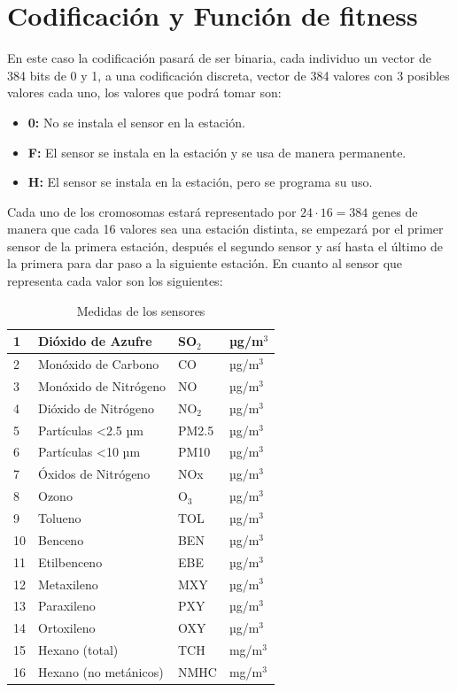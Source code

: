 \documentclass[12pt, spanish, pdftex]{UC3M_document}
\begin{document}
\section{Codificación y Función de fitness}
En este caso la codificación pasará de ser binaria, cada individuo un vector de 384 bits de 0 y 1, a una codificación discreta, vector de 384 valores con 3 posibles valores cada uno, los valores que podrá tomar son:
\begin{itemize}
	\item \textbf{0:} No se instala el sensor en la estación.
	\item \textbf{F:} El sensor se instala en la estación y se usa de manera permanente.
	\item \textbf{H:} El sensor se instala en la estación, pero se programa su uso.
\end{itemize}
Cada uno de los cromosomas estará representado por $24 \cdot 16=384$ genes de manera que cada 16 valores sea una estación distinta, se empezará por el primer sensor de la primera estación, después el segundo sensor y así hasta el último de la primera para dar paso a la siguiente estación. En cuanto al sensor que representa cada valor son los siguientes:
\begin{table}[H]
	\centering
	\caption{Medidas de los sensores}
	\begin{tabular}{|l|l|l|l|}
		\hline
		1  & Dióxido de Azufre           & SO$_2$ & µg/m$^3$ \\ \hline
		2  & Monóxido de Carbono         & CO     & µg/m$^3$ \\ \hline
		3  & Monóxido de Nitrógeno       & NO     & µg/m$^3$ \\ \hline
		4  & Dióxido de Nitrógeno        & NO$_2$ & µg/m$^3$ \\ \hline
		5  & Partículas \textless 2.5 µm & PM2.5  & µg/m$^3$ \\ \hline
		6  & Partículas \textless 10 µm  & PM10   & µg/m$^3$ \\ \hline
		7  & Óxidos de Nitrógeno         & NOx    & µg/m$^3$ \\ \hline
		8  & Ozono                       & O$_3$  & µg/m$^3$ \\ \hline
		9  & Tolueno                     & TOL    & µg/m$^3$ \\ \hline
		10 & Benceno                     & BEN    & µg/m$^3$ \\ \hline
		11 & Etilbenceno                 & EBE    & µg/m$^3$ \\ \hline
		12 & Metaxileno                  & MXY    & µg/m$^3$ \\ \hline
		13 & Paraxileno                  & PXY    & µg/m$^3$ \\ \hline
		14 & Ortoxileno                  & OXY    & µg/m$^3$ \\ \hline
		15 & Hexano (total)              & TCH    & mg/m$^3$ \\ \hline
		16 & Hexano (no metánicos)       & NMHC   & mg/m$^3$ \\ \hline
	\end{tabular}
\end{table}
\end{document}
